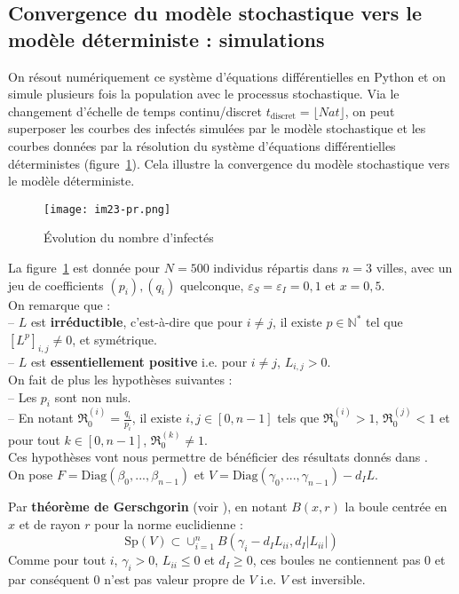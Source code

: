 \documentclass[a4paper,10.9pt]{article}
\newcommand{\R}{\mathfrak{R}_0}
\begin{document}
\subsection{Convergence du modèle stochastique vers le modèle déterministe : simulations}
On résout numériquement ce système d'équations différentielles en Python et on simule plusieurs fois la population avec le processus stochastique. Via le changement d'échelle de temps continu/discret $t_{\text{discret}}=\lfloor Nat \rfloor$, on peut superposer les courbes des infectés simulées par le modèle stochastique et les courbes données par la résolution du système d'équations différentielles déterministes (figure~\ref{fig:nb_inf_syst_ed}). Cela illustre la convergence du modèle stochastique vers le modèle déterministe.

\begin{figure}[h]
    \centering
    \texttt{[image: im23-pr.png]}
    \caption{Évolution du nombre d'infectés}
    \label{fig:nb_inf_syst_ed}
\end{figure}

La figure~\ref{fig:nb_inf_syst_ed} est donnée pour $N=500$ individus répartis dans $n=3$ villes, avec un jeu de coefficients $(p_i),(q_i)$ quelconque, $\varepsilon_S=\varepsilon_I=0,1$ et $x=0,5$. \\

On remarque que : \\
-- $L$ est \textbf{irréductible}, c'est-à-dire que pour $i\neq j$, il existe $p \in \mathbb{N}^*$ tel que $[L^p]_{i,j}\neq 0$, et symétrique. \\
-- $L$ est \textbf{essentiellement positive} i.e. pour $i \neq j$, $L_{i,j}>0$. \\

On fait de plus les hypothèses suivantes : \\
-- Les $p_i$ sont non nuls. \\ 
-- En notant $\R^{(i)}=\frac{q_i}{p_i}$, il existe $i,j \in [0,n-1]$ tels que $\R^{(i)}>1$, $\R^{(j)}<1$ et pour tout $k \in [0,n-1]$, $\R^{(k)}\neq 1$. \\

Ces hypothèses vont nous permettre de bénéficier des résultats donnés dans \cite{GaoDong}.  \\

On pose $F=\text{Diag}(\beta_0,...,\beta_{n-1})$ et $V=\text{Diag}(\gamma_0,...,\gamma_{n-1})-d_I L$.

Par \textbf{théorème de Gerschgorin} (voir \cite{Gerschgorin}), en notant $B(x,r)$ la boule centrée en $x$ et de rayon $r$ pour la norme euclidienne : 
$$\text{Sp}(V) \subset \cup_{i=1}^n B(\gamma_i-d_I L_{ii}, d_I |L_{ii}|)$$
Comme pour tout $i$, $\gamma_i > 0$, $L_{ii}\leq 0$ et $d_I\geq 0$, ces boules ne contiennent pas $0$ et par conséquent $0$ n'est pas valeur propre de $V$ i.e. $V$ est inversible. \\
\end{document}
